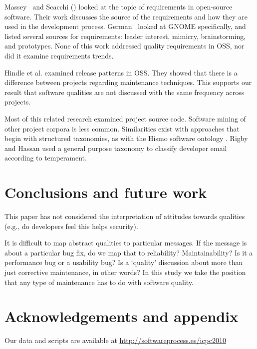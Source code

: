 \documentclass{acm_proc_article-sp}
\begin{document}
Massey~\cite{massey02icse} and Scacchi (\cite{scacchi02,scacchi05b}) looked at the topic of requirements in open-source software. Their work discusses the source of the requirements and how they are used in the development process. German~\cite{german03gnome} looked at GNOME specifically, and listed several sources for requirements: leader interest, mimicry, brainstorming, and prototypes. None of this work  addressed quality requirements in OSS, nor did it examine requirements trends.

Hindle et al. \cite{Hindle2007} examined release patterns in OSS. They showed that there is a difference between projects regarding maintenance techniques. This supports our result that software qualities are not discussed with the same frequency across projects.

Most of this related research examined project source code. Software mining of other project corpora is less common. Similarities exist with approaches that begin with structured taxonomies, as with the Hismo software ontology \cite{girba06}. Rigby and Hassan \cite{rigby07msr} used a general purpose taxonomy to classify developer email according to temperament.

\section{Conclusions and future work}

%



This paper has not considered the interpretation of attitudes towards qualities (e.g., do developers feel this helps security).

It is difficult to map abstract qualities to particular messages. If the message is about a particular bug fix, do we map that to reliability? Maintainability? Is it a performance bug or a usability bug? Is a `quality' discussion about more than just corrective maintenance, in other words? In this study we take the position that any type of maintenance has to do with software quality.

\section{Acknowledgements and appendix}
Our data and scripts are available at \url{http://softwareprocess.es/icpc2010}



\end{document}
